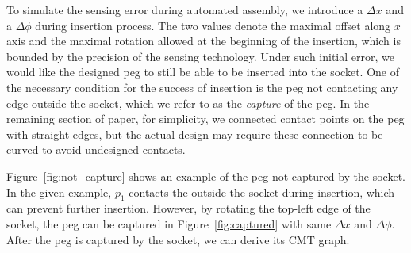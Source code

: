 \documentclass[11pt, twocolumn]{article}
\begin{document}



To simulate the sensing error during automated assembly, we introduce a $\Delta x$ and a $\Delta\phi$ during insertion process. The two values denote the maximal offset along $x$ axis and the maximal rotation allowed at the beginning of the insertion, which is bounded by the precision of the sensing technology. Under such initial error, we would like the designed peg to still be able to be inserted into the socket. One of the necessary condition for the success of insertion is the peg not contacting any edge outside the socket, which we refer to as the {\em capture} of the peg. In the remaining section of paper, for simplicity, we connected contact points on the peg with straight edges, but the actual design may require these connection to be curved to avoid undesigned contacts. 



Figure~\ref{fig:not_capture} shows an example of the peg not captured by the socket. In the given example, $p_1$ contacts the outside the socket during insertion, which can prevent further insertion. However, by rotating the top-left edge of the socket, the peg can be captured in Figure~\ref{fig:captured} with same $\Delta x$ and $\Delta\phi$. After the peg is captured by the socket, we can derive its CMT graph. 
\end{document}

